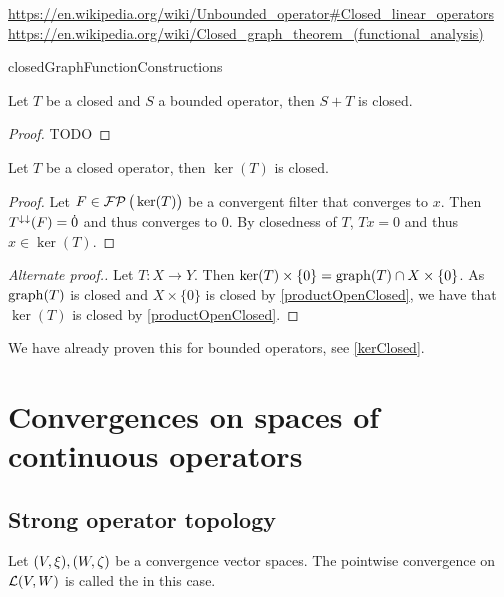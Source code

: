 \url{https://en.wikipedia.org/wiki/Unbounded_operator#Closed_linear_operators}
\url{https://en.wikipedia.org/wiki/Closed_graph_theorem_(functional_analysis)}

{closedGraphFunctionConstructions}

\begin{lemma} \label{algebraClosedOperators}
Let $T$ be a closed and $S$ a bounded operator, then $S+T$ is closed.
\end{lemma}
\begin{proof}
TODO
\end{proof}

\begin{lemma} \label{closedOperatorKernelClosed}
Let $T$ be a closed operator, then $\ker(T)$ is closed.
\end{lemma}
\begin{proof}
Let $F\in\operatorname{\mathcal{FP}}\big(\ker(T)\big)$ be a convergent filter that converges to $x$. Then $T^{\downarrow\downarrow}(F) = \dot{0}$ and thus converges to $0$. By closedness of $T$, $Tx = 0$ and thus $x\in\ker(T)$. 
\end{proof}
\begin{proof}[Alternate proof.]
Let $T: X\to Y$. Then $\ker(T)\times\{0\} = \operatorname{graph}(T)\cap X\times\{0\}$. As $\operatorname{graph}(T)$ is closed and $X\times\{0\}$ is closed by \ref{productOpenClosed}, we have that $\ker(T)$ is closed by \ref{productOpenClosed}.
\end{proof}
We have already proven this for bounded operators, see \ref{kerClosed}.

\section{Convergences on spaces of continuous operators}
\subsection{Strong operator topology}
\begin{definition}
Let $\sSet{V,\xi}, \sSet{W,\zeta}$ be a convergence vector spaces. The pointwise convergence on $\operatorname{\mathcal{L}}(V,W)$ is called the  in this case.
\end{definition}

